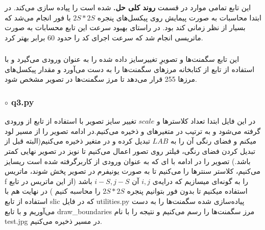 \documentclass[a4paper,12pt]{article}
\begin{document}
\subsubsection*{}
این تابع تمامی موارد در قسمت 
\textbf{روند کلی حل.}
شده است را پیاده سازی می‌کند. در ابتدا محاسبات به صورت پیمایش روی پیکسل‌های پنجره $ 2S * 2S $ با فور انجام می‌شد که بسیار از نظر زمانی کند بود. در راستای بهبود سرعت این تابع محسابات به صورت ماتریسی انجام شد که سرعت اجرای کد را حدود 60 برابر بهتر کرد.
\subsubsection*{}
این تابع سگمنت‌ها و تصویرِ تغییرسایز داده شده را به عنوان ورودی می‌گیرد و با استفاده از تابع 
از کتابخانه 
مرزهای سگمنت‌ها را به دست می‌آورد و مقدار 
پیکسل‌های مرزها 255 قرار می‌دهد تا مرز سگمنت‌ها در تصویر مشخص شود.
\subsubsection*{$\circ$ q3.py}
در این فایل ابتدا تعداد کلاسترها و $ scale $ تغییر سایز تصویر با استفاده از تابع 
از ورودی گرفته می‌شود و به ترتیب در متغیرهای 
و
ذخیره ‌می‌کنیم.در ادامه تصویر 
را از مسیر 
لود میکنم و فضای رنگی آن را به 
$ LAB$
تبدیل کرده و در متغیر
ذخیره می‌کنیم(البته قبل از تبدیل کردن فضای رنگی، فیلتر 
روی تصور اعمال می‌کنیم تا نویز‌ در تصویر نهایی کمتر باشد.) تصویر را در ادامه با 
‌ای 
که به عنوان ورودی از کاربرگرفته شده است ریسایز می‌کنیم، کلاستر سنتر‌ها را 
می‌کنیم تا به صورت یونیفرم در تصویر پخش شوند، ماتریس f را به گونه‌ای میسازیم که درایه‌ی $ i, j $ آن
$ i-S, j-S $
باشد (از این ماتریس در تابع 
استفاده میکنیم تا بدون فور بتوانیم پنجره $ 2S * 2S $ را محاسبه کنیم
)
در نهایت هم با استفاده از تابع slic که در فایل utilities.py پیاده‌سازی شده سگمنت‌ها را به دست می‌آوریم و با تابع draw\_boundaries مرز سگمنت‌ها را رسم می‌کنیم و نتیجه را با نام test.jpg در مسیر 
ذخیره می‌کنیم.
\end{document}
